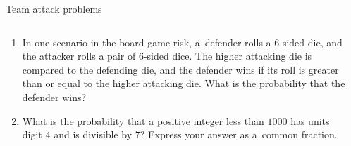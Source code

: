 \documentclass[9pt,aspectratio=169]{beamer}
\begin{document}
\begin{frame}{Team attack problems}
  \begin{columns}[T]
    \begin{column}{0.5\textwidth}
      \begin{enumerate}
        \item In one scenario in the board game risk, a~defender rolls a $6$-sided die, and the attacker rolls a pair of $6$-sided dice.  The higher attacking die is compared to the defending die, and the defender wins if its roll is greater than or equal to the higher attacking die.  What is the probability that the defender wins?
        \item What is the probability that a positive integer less than $1000$ has units digit $4$ and is divisible by $7$?  Express your answer as a~common fraction.
        
      \end{enumerate}
    \end{column}
    \begin{column}{0.5\textwidth}
    \end{column}
  \end{columns}
\end{frame}

\end{document}
